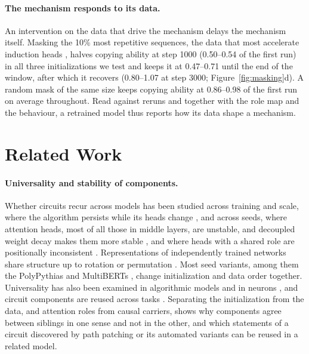 \documentclass[11pt]{article}
\begin{document}
\paragraph{The mechanism responds to its data.}
An intervention on the data that drive the mechanism delays the mechanism itself.
Masking the 10\% most repetitive sequences, the data that most accelerate induction heads \citep{chen2026mechanistic}, halves copying ability at step 1000 (0.50--0.54 of the first run) in all three initializations we test and keeps it at 0.47--0.71 until the end of the window, after which it recovers (0.80--1.07 at step 3000; Figure~\ref{fig:masking}d).
A random mask of the same size keeps copying ability at 0.86--0.98 of the first run on average throughout.
Read against reruns and together with the role map and the behaviour, a retrained model thus reports how its data shape a mechanism.

\section{Related Work}

\paragraph{Universality and stability of components.}
Whether circuits recur across models has been studied across training and scale, where the algorithm persists while its heads change \citep{tigges2024llm}, and across seeds, where attention heads, most of all those in middle layers, are unstable, and decoupled weight decay makes them more stable \citep{bali2026quantifying}, and where heads with a shared role are positionally inconsistent \citep{trott2025generalizability}.
Representations of independently trained networks share structure up to rotation or permutation \citep{li2016convergent,kornblith2019similarity,ainsworth2023git}.
Most seed variants, among them the PolyPythias \citep{vanderwal2025polypythias} and MultiBERTs \citep{sellam2022multiberts}, change initialization and data order together.
Universality has also been examined in algorithmic models and in neurons \citep{chughtai2023toy,gurnee2024universal}, and circuit components are reused across tasks \citep{merullo2024circuit}.
Separating the initialization from the data, and attention roles from causal carriers, shows why components agree between siblings in one sense and not in the other, and which statements of a circuit discovered by path patching or its automated variants \citep{wang2023interpretability,conmy2023towards} can be reused in a related model.
\end{document}
